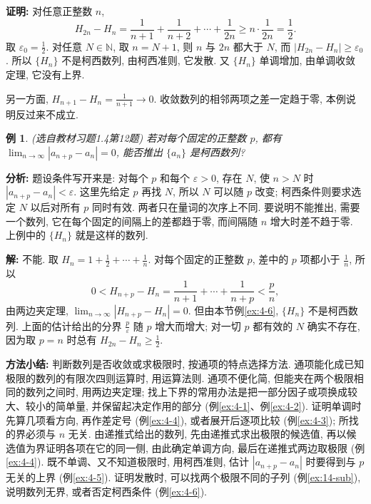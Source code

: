 \documentclass[UTF8,openany]{ctexbook}
\theoremstyle{chinesetextbook}
\newtheorem{example}{例}[section]
\newenvironment{cnproof}{\par\indent\textbf{证明:} \ignorespaces}{\par}
\newenvironment{cnsolution}{\par\indent\textbf{解:} \ignorespaces}{\par}
\begin{document}
\begin{cnproof}
对任意正整数 $n$,
\[
H_{2n}-H_n=\frac1{n+1}+\frac1{n+2}+\cdots+\frac1{2n}\ge n\cdot\frac1{2n}=\frac12.
\]
取 $\displaystyle\varepsilon_0=\frac12$. 对任意 $N\in\mathbb N$, 取 $n=N+1$, 则 $n$ 与 $2n$ 都大于 $N$, 而 $|H_{2n}-H_n|\ge\varepsilon_0$. 所以 $\{H_n\}$ 不是柯西数列, 由柯西准则, 它发散. 又 $\{H_n\}$ 单调增加, 由单调收敛定理, 它没有上界.

另一方面, $\displaystyle H_{n+1}-H_n=\frac1{n+1}\to0$. 收敛数列的相邻两项之差一定趋于零, 本例说明反过来不成立.
\end{cnproof}
\begin{example}
\textnormal{(选自教材习题1.4第12题)} 若对每个固定的正整数 $p$, 都有 $\displaystyle\lim_{n\to\infty}|a_{n+p}-a_n|=0$, 能否推出 $\{a_n\}$ 是柯西数列?
\end{example}
\par\indent\textbf{分析:} 题设条件写开来是: 对每个 $p$ 和每个 $\varepsilon>0$, 存在 $N$, 使 $n>N$ 时 $|a_{n+p}-a_n|<\varepsilon$. 这里先给定 $p$ 再找 $N$, 所以 $N$ 可以随 $p$ 改变; 柯西条件则要求选定 $N$ 以后对所有 $p$ 同时有效. 两者只在量词的次序上不同. 要说明不能推出, 需要一个数列, 它在每个固定的间隔上的差都趋于零, 而间隔随 $n$ 增大时差不趋于零. 上例中的 $\{H_n\}$ 就是这样的数列.
\begin{cnsolution}
不能. 取 $\displaystyle H_n=1+\frac12+\cdots+\frac1n$. 对每个固定的正整数 $p$, 差中的 $p$ 项都小于 $\displaystyle\frac1n$, 所以
\[
0<H_{n+p}-H_n=\frac1{n+1}+\cdots+\frac1{n+p}<\frac pn,
\]
由两边夹定理, $\displaystyle\lim_{n\to\infty}|H_{n+p}-H_n|=0$. 但由本节例\ref{ex:4-6}, $\{H_n\}$ 不是柯西数列. 上面的估计给出的分界 $\displaystyle\frac p\varepsilon$ 随 $p$ 增大而增大; 对一切 $p$ 都有效的 $N$ 确实不存在, 因为取 $p=n$ 时总有 $\displaystyle H_{2n}-H_n\ge\frac12$.
\end{cnsolution}
\par\indent\textbf{方法小结:} 判断数列是否收敛或求极限时, 按通项的特点选择方法. 通项能化成已知极限的数列的有限次四则运算时, 用运算法则. 通项不便化简, 但能夹在两个极限相同的数列之间时, 用两边夹定理; 找上下界的常用办法是把一部分因子或项换成较大、较小的简单量, 并保留起决定作用的部分 (例\ref{ex:4-1}、例\ref{ex:4-2}). 证明单调时先算几项看方向, 再作差定号 (例\ref{ex:4-4}), 或者展开后逐项比较 (例\ref{ex:4-3}); 所找的界必须与 $n$ 无关. 由递推式给出的数列, 先由递推式求出极限的候选值, 再以候选值为界证明各项在它的同一侧, 由此确定单调方向, 最后在递推式两边取极限 (例\ref{ex:4-4}). 既不单调、又不知道极限时, 用柯西准则, 估计 $|a_{n+p}-a_n|$ 时要得到与 $p$ 无关的上界 (例\ref{ex:4-5}). 证明发散时, 可以找两个极限不同的子列 (例\ref{ex:14-sub}), 说明数列无界, 或者否定柯西条件 (例\ref{ex:4-6}).
\end{document}
